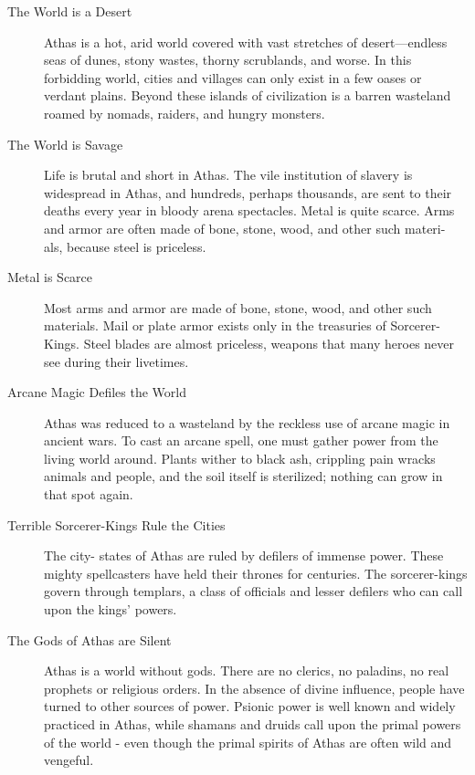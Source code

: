 \begin{description}
    \item [The World is a Desert] Athas is a hot, arid world covered with vast
        stretches of desert—endless seas of dunes, stony wastes, thorny scrublands, and worse. In this
        forbidding world, cities and villages can only exist in a few oases or verdant plains. Beyond
        these islands of civilization is a barren wasteland roamed by nomads, raiders, and hungry monsters.

    \item [The World is Savage] Life is brutal and short in Athas. The vile institution of slavery is
        widespread in Athas, and hundreds, perhaps thousands, are sent to their deaths every year in
        bloody arena spectacles. Metal is quite scarce. Arms and armor are often made of bone, stone,
        wood, and other such materi- als, because steel is priceless.

    \item [Metal is Scarce] Most arms and armor are made of bone, stone, wood, and other such materials.
        Mail or plate armor exists only in the treasuries of Sorcerer-Kings. Steel blades are almost
        priceless, weapons that many heroes never see during their livetimes.

    \item [Arcane Magic Defiles the World] Athas was reduced to a wasteland by the reckless use of arcane
        magic in ancient wars. To cast an arcane spell, one must gather power from the living world around.
        Plants wither to black ash, crippling pain wracks animals and people, and the soil itself is
        sterilized; nothing can grow in that spot again.

    \item [Terrible Sorcerer-Kings Rule the Cities] The city- states of Athas are ruled by defilers of
        immense power. These mighty spellcasters have held their thrones for centuries. The sorcerer-kings
        govern through templars, a class of officials and lesser defilers who can call upon the kings’ powers.

    \item [The Gods of Athas are Silent] Athas is a world without gods. There are no clerics, no paladins,
        no real prophets or religious orders. In the absence of divine influence, people have turned to
        other sources of power. Psionic power is well known and widely practiced in Athas, while shamans
        and druids call upon the primal powers of the world - even though the primal spirits of Athas are
        often wild and vengeful.


\end{description}
